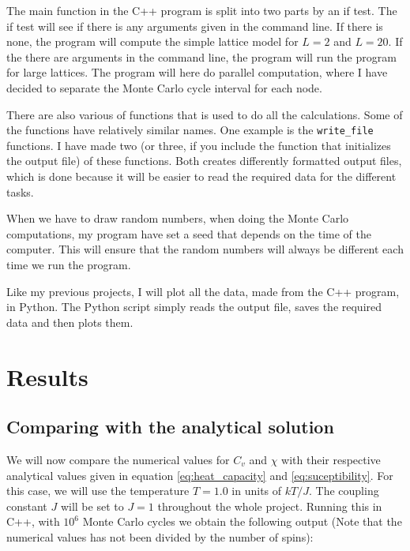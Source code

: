 \documentclass[12pt]{article}
\begin{document}
The main function in the C++ program is split into two parts by an if test. The if test will see if there is any arguments given in the command line. If there is none, the program will compute the simple lattice model for $L = 2$ and $L = 20$. If the there are arguments in the command line, the program will run the program for large lattices. The program will here do parallel computation, where I have decided to separate the Monte Carlo cycle interval for each node. 

There are also various of functions that is used to do all the calculations. Some of the functions have relatively similar names. One example is the \texttt{write\_file} functions. I have made two (or three, if you include the function that initializes the output file) of these functions. Both creates differently formatted output files, which is done because it will be easier to read the required data for the different tasks. 

When we have to draw random numbers, when doing the Monte Carlo computations, my program have set a seed that depends on the time of the computer. This will ensure that the random numbers will always be different each time we run the program.

Like my previous projects, I will plot all the data, made from the C++ program, in Python. The Python script simply reads the output file, saves the required data and then plots them.
\section{Results} \label{section:result}
\subsection{Comparing with the analytical solution}
We will now compare the numerical values for $C_v$ and $\chi$ with their respective analytical values given in equation \ref{eq:heat_capacity} and \ref{eq:suceptibility}. For this case, we will use the temperature $T = 1.0$ in units of $kT/J$. The coupling constant $J$ will be set to $J=1$ throughout the whole project. Running this in C++, with $10^6$ Monte Carlo cycles we obtain the following output (Note that the numerical values has not been divided by the number of spins):
\end{document}
